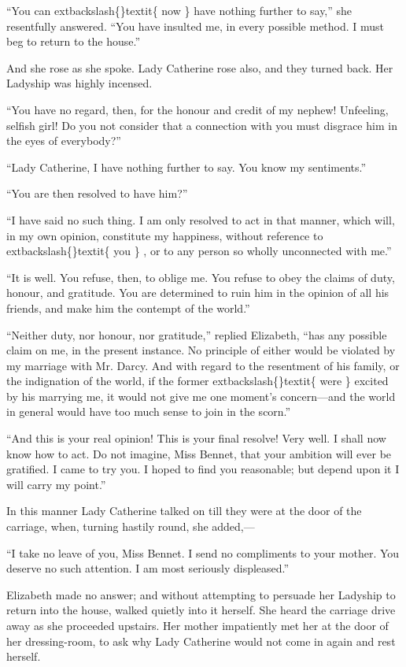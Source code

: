 \documentclass[10pt]{book}
\begin{document}
   “You can
   	extbackslash\{\}textit\{
    now
   \}
   have nothing further to say,” she resentfully answered.
“You have insulted me, in every possible method. I must beg to return to
the house.”
  

   And she rose as she spoke. Lady Catherine rose also, and they turned
back. Her Ladyship was highly incensed.
  

   “You have no regard, then, for the honour and credit of my nephew!
Unfeeling, selfish girl! Do you not consider that a connection with you
must disgrace him in the eyes of everybody?”
  

   “Lady Catherine, I have nothing further to say. You know my sentiments.”
  

   “You are then resolved to have him?”
  

   “I have said no such thing. I am only resolved to act in that manner,
which will, in my own opinion, constitute my happiness, without
reference to
   	extbackslash\{\}textit\{
    you
   \}
   , or to any person so wholly unconnected with me.”
  

   “It is well. You refuse, then, to oblige me. You refuse to obey the
claims of duty, honour, and gratitude. You are determined to ruin him in
the opinion of all his friends, and make him the contempt of the world.”
  

   “Neither duty, nor honour, nor gratitude,” replied Elizabeth, “has any
possible claim on me, in the present instance. No principle of either
would be violated by my
   marriage with Mr. Darcy. And with regard to the
resentment of his family, or the indignation of the world, if the former
   	extbackslash\{\}textit\{
    were
   \}
   excited by his marrying me, it would not give me one moment’s
concern—and the world in general would have too much sense to join in
the scorn.”
  

   “And this is your real opinion! This is your final resolve! Very well. I
shall now know how to act. Do not imagine, Miss Bennet, that your
ambition will ever be gratified. I came to try you. I hoped to find you
reasonable; but depend upon it I will carry my point.”
  

   In this manner Lady Catherine talked on till they were at the door of
the carriage, when, turning hastily round, she added,—
  

   “I take no leave of you, Miss Bennet. I send no compliments to your
mother. You deserve no such attention. I am most seriously displeased.”
  

   Elizabeth made no answer; and without attempting to persuade her
Ladyship to return into the house, walked quietly into it herself. She
heard the carriage drive away as she proceeded upstairs. Her mother
impatiently met her at the door of her dressing-room, to ask why Lady
Catherine would not come in again and rest herself.
  
\end{document}
